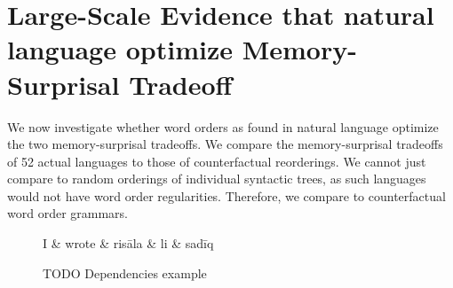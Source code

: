\documentclass[11pt,letterpaper]{article}
\begin{document}


\section{Large-Scale Evidence that natural language optimize Memory-Surprisal Tradeoff}

We now investigate whether word orders as found in natural language optimize the two memory-surprisal tradeoffs.
We compare the memory-surprisal tradeoffs of 52 actual languages to those of counterfactual reorderings.
We cannot just compare to random orderings of individual syntactic trees, as such languages would not have word order regularities.
Therefore, we compare to counterfactual word order grammars.

\begin{figure}
\centering
\begin{dependency}[theme = simple]
   \begin{deptext}[column sep=1em]
	   I \&	   wrote \& risāla \& li \& sadīq  \\
   \end{deptext}
\end{dependency}
	\caption{TODO Dependencies example}\label{fig:dependency}
\end{figure}
\end{document}
